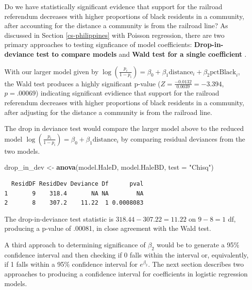 \documentclass[
]{krantz}
\newenvironment{Shaded}{\begin{snugshade}}{\end{snugshade}}
\newcommand{\DataTypeTok}[1]{\textcolor[rgb]{0.27,0.27,0.27}{#1}}
\newcommand{\KeywordTok}[1]{\textcolor[rgb]{0.27,0.27,0.27}{\textbf{#1}}}
\newcommand{\NormalTok}[1]{#1}
\newcommand{\StringTok}[1]{\textcolor[rgb]{0.5,0.5,0.5}{#1}}
\begin{document}
Do we have statistically significant evidence that support for the railroad referendum decreases with higher proportions of black residents in a community, after accounting for the distance a community is from the railroad line? As discussed in Section \ref{cs-philippines} with Poisson regression, there are two primary approaches to testing signficance of model coefficients: \textbf{Drop-in-deviance test to compare models}  and \textbf{Wald test for a single coefficient} .

With our larger model given by \(\log\left(\frac{p_i}{1-p_i}\right) = \beta_0+\beta_1\textrm{distance}_i+\beta_2\textrm{pctBlack}_i\), the Wald test produces a highly significant p-value (\(Z=\frac{-0.0132}{0.0039}= -3.394\), \(p=.00069\)) indicating significant evidience that support for the railroad referendum decreases with higher proportions of black residents in a community, after adjusting for the distance a community is from the railroad line.

The drop in deviance test would compare the larger model above to the reduced model \(\log\left(\frac{p_i}{1-p_i}\right) = \beta_0+\beta_1\textrm{distance}_i\) by comparing residual deviances from the two models.

\begin{Shaded}
\begin{Highlighting}[]
\NormalTok{drop_in_dev <-}\StringTok{ }\KeywordTok{anova}\NormalTok{(model.HaleD, model.HaleBD, }\DataTypeTok{test =} \StringTok{"Chisq"}\NormalTok{)}
\end{Highlighting}
\end{Shaded}

\begin{verbatim}
  ResidDF ResidDev Deviance Df      pval
1       9    318.4       NA NA        NA
2       8    307.2    11.22  1 0.0008083
\end{verbatim}

The drop-in-deviance test statistic is \(318.44 - 307.22 = 11.22\) on \(9 - 8 = 1\) df, producing a p-value of .00081, in close agreement with the Wald test.

A third approach to determining significance of \(\beta_2\) would be to generate a 95\% confidence interval and then checking if 0 falls within the interval or, equivalently, if 1 falls within a 95\% confidence interval for \(e^{\beta_2}.\) The next section describes two approaches to producing a confidence interval for coefficients in logistic regression models.
\end{document}
